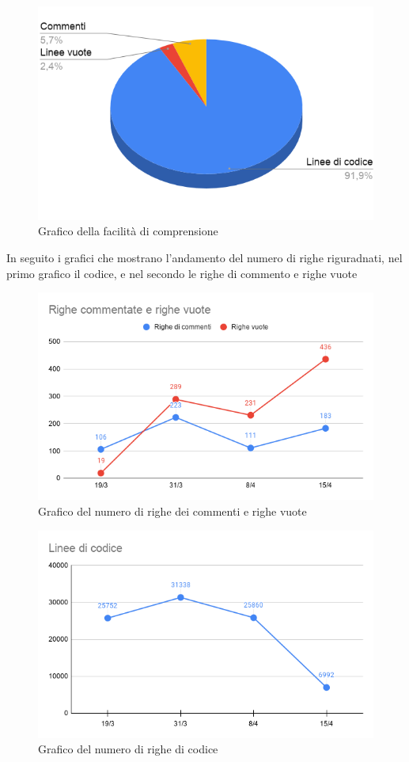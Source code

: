     \begin{figure}[H]
        \centering
        \includegraphics[width=10 cm]{source/sections/images/facilitaDelCodice.png}
        \caption{Grafico della facilità di comprensione}
    \end{figure}

In seguito i grafici che mostrano l'andamento del numero di righe riguradnati, nel primo grafico il codice, e nel secondo
le righe di commento e righe vuote

\begin{figure}[H]
    \centering
    \includegraphics[width=10 cm]{source/sections/images/Valori-delle-righe.png}
    \caption{Grafico del numero di righe dei commenti e righe vuote}
\end{figure}

\begin{figure}[H]
    \centering
    \includegraphics[width=10 cm]{source/sections/images/numCodice.png}
    \caption{Grafico del numero di righe di codice}
\end{figure}

